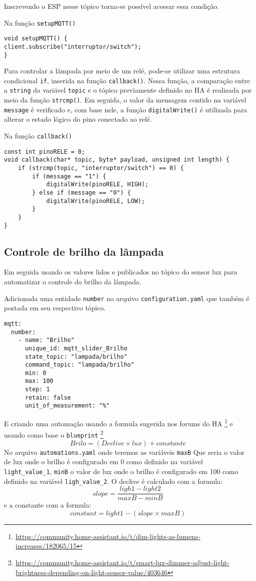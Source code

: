 \documentclass[]{abntex2}
\begin{document}
Inscrevendo o ESP nesse tópico torna-se possível acessar essa condição.

Na função \texttt{setupMQTT()}

\begin{verbatim}
void setupMQTT() {
client.subscribe("interruptor/switch");
}
\end{verbatim}

Para controlar a lâmpada por meio de um relé, pode-se utilizar uma estrutura
condicional \texttt{if}, inserida na função \texttt{callback()}. Nessa função, a
comparação entre a \texttt{string} da variável \texttt{topic} e o tópico
previamente definido no HA é realizada por meio da
função \texttt{strcmp()}. Em seguida, o valor da mensagem contido na variável
\texttt{message} é verificado e, com base nele, a função \texttt{digitalWrite()}
é utilizada para alterar o estado lógico do pino conectado ao relé.

Na função \texttt{callback()}
\begin{verbatim}
const int pinoRELE = 0;
void callback(char* topic, byte* payload, unsigned int length) {
	if (strcmp(topic, "interruptor/switch") == 0) {
		if (message == "1") {
			digitalWrite(pinoRELE, HIGH);
		} else if (message == "0") {
			digitalWrite(pinoRELE, LOW);
		}
	}
}
\end{verbatim}
\subsection{Controle de brilho da lâmpada}
Em seguida usando os valores lidos e publicados no tópico do sensor lux
para automatizar o controle do brilho da lâmpada.

Adicionada uma entidade \texttt{number} no arquivo \texttt{configuration.yaml} que também é postada em seu
respectivo tópico.
\begin{verbatim}
mqtt:
  number:
    - name: "Brilho"
      unique_id: mqtt_slider_Brilho
      state_topic: "lampada/brilho"
      command_topic: "lampada/brilho"
      min: 0
      max: 100
      step: 1
      retain: false
      unit_of_measurement: "%"
\end{verbatim}
E criando uma automação usando a formula sugerida nos forums do HA
\footnote{\url{https://community.home-assistant.io/t/dim-lights-as-lumens-increases/182065/15}}
e usando como base o \texttt{blueprint} \footnote{\url{https://community.home-assistant.io/t/smart-lux-dimmer-adjust-light-brightness-depending-on-light-sensor-value/403646}}
\[
	Brilo = (Declive \times  lux) + constante
\]
No arquivo \texttt{automations.yaml} onde teremos as variáveis \texttt{maxB}
Que seria o valor de lux onde o brilho é configurado em 0 como definido na variável \texttt{light\_value\_1},
\texttt{minB} o valor de lux onde o brilho é configurado em 100 como definido na variável \texttt{ligh\_value\_2}.
O declive é calculado com a formula:
\[
slope= \frac{ligh1 - light2}{maxB - minB}
\]
e a constante com a formula:
\[
constant = light1 - (slope \times maxB)
\]
\end{document}
